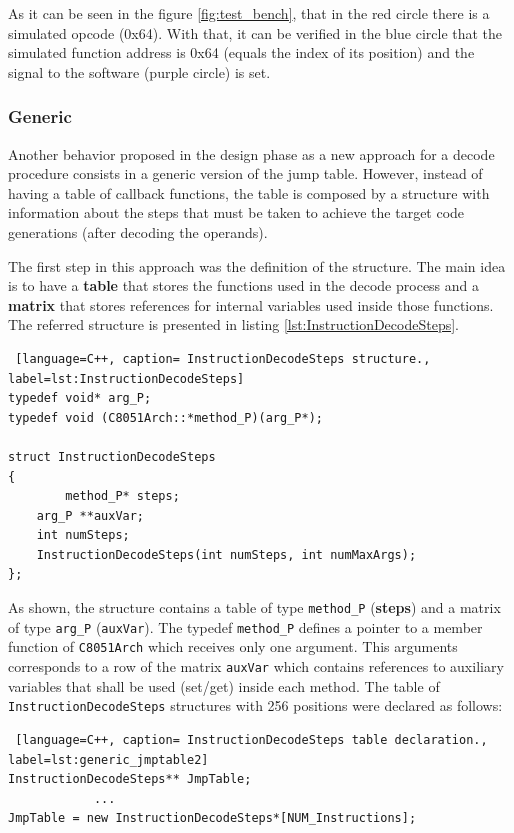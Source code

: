 As it can be seen in the figure \ref{fig:test_bench}, that in the red circle there is a simulated opcode (0x64). With that, it can be verified in the blue circle that the simulated function address is 0x64 (equals the index of its position) and the signal to the software (purple circle) is set. 
\subsubsection{Generic}

Another behavior proposed in the design phase as a new approach for a decode procedure consists in a generic version of the jump table. However, instead of having a table of callback functions, the table is composed by a structure with information about the steps that must be taken to achieve the target code generations (after decoding the operands).


The first step in this approach was the definition of the structure. The main idea is to have a \textbf{table} that stores the functions used in the decode process and a \textbf{matrix} that stores references for internal variables used inside those functions. The referred structure is presented in listing \ref{lst:InstructionDecodeSteps}.

\begin{lstlisting} [language=C++, caption= InstructionDecodeSteps structure., label=lst:InstructionDecodeSteps]
typedef void* arg_P;
typedef void (C8051Arch::*method_P)(arg_P*);

struct InstructionDecodeSteps 
{
		method_P* steps;
    arg_P **auxVar;
    int numSteps;
    InstructionDecodeSteps(int numSteps, int numMaxArgs);
};
\end{lstlisting}

As shown, the structure contains a table of type \texttt{method\_P} (\textbf{steps}) and a matrix of type \texttt{arg\_P} (\texttt{auxVar}). The typedef \texttt{method\_P} defines a pointer to a member function of \texttt{C8051Arch} which receives only one argument. This arguments corresponds to a row of the matrix \texttt{auxVar} which contains references to auxiliary variables that shall be used (set/get) inside each method. The table of \texttt{InstructionDecodeSteps} structures with 256 positions were declared as follows:

\begin{lstlisting} [language=C++, caption= InstructionDecodeSteps table declaration., label=lst:generic_jmptable2]
InstructionDecodeSteps** JmpTable;
			...
JmpTable = new InstructionDecodeSteps*[NUM_Instructions];	
\end{lstlisting}

